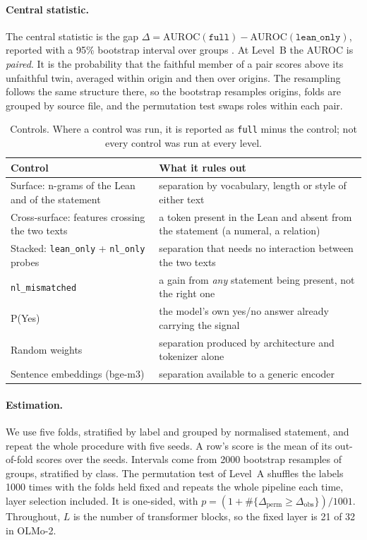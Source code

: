 \documentclass[10pt]{article}
\newcommand{\vr}[1]{\texttt{#1}}
\newcommand{\D}{\Delta}
\begin{document}
\paragraph{Central statistic.}
The central statistic is the gap
$\D = \mathrm{AUROC}(\vr{full}) - \mathrm{AUROC}(\vr{lean\_only})$, reported with a 95\% bootstrap interval over groups \citep{efron}.
At Level~B the AUROC is \emph{paired}. It is the probability that the faithful member of a pair scores above its
unfaithful twin, averaged within origin and then over origins. The resampling follows the same structure there, so
the bootstrap resamples origins, folds are grouped by source file, and the permutation test swaps roles within each
pair.

\begin{table}[h]
\centering
\caption{Controls. Where a control was run, it is reported as \vr{full} minus the control; not every control was run at every level.}
\label{tab:controles}
\vspace{2pt}
\begin{tabularx}{\linewidth}{@{}lX@{}}
\toprule
Control & What it rules out\\
\midrule
Surface: n-grams of the Lean and of the statement & separation by vocabulary, length or style of either text\\
Cross-surface: features crossing the two texts & a token present in the Lean and absent from the statement (a numeral, a relation)\\
Stacked: \vr{lean\_only} + \vr{nl\_only} probes & separation that needs no interaction between the two texts\\
\vr{nl\_mismatched} & a gain from \emph{any} statement being present, not the right one\\
P(Yes) & the model's own yes/no answer already carrying the signal\\
Random weights & separation produced by architecture and tokenizer alone\\
Sentence embeddings (bge-m3) & separation available to a generic encoder\\
\bottomrule
\end{tabularx}
\end{table}

\paragraph{Estimation.}
We use five folds, stratified by label and grouped by normalised statement, and repeat the whole procedure with
five seeds. A row's score is the mean of its out-of-fold scores over the seeds. Intervals come from 2000 bootstrap
resamples of groups, stratified by class. The permutation test of Level~A shuffles the labels 1000 times with the
folds held fixed and repeats the whole pipeline each time, layer selection included. It is one-sided, with
$p = (1 + \#\{\D_{\mathrm{perm}} \ge \D_{\mathrm{obs}}\})/1001$. Throughout, $L$ is the number of transformer
blocks, so the fixed layer is 21 of 32 in OLMo-2.
\end{document}
